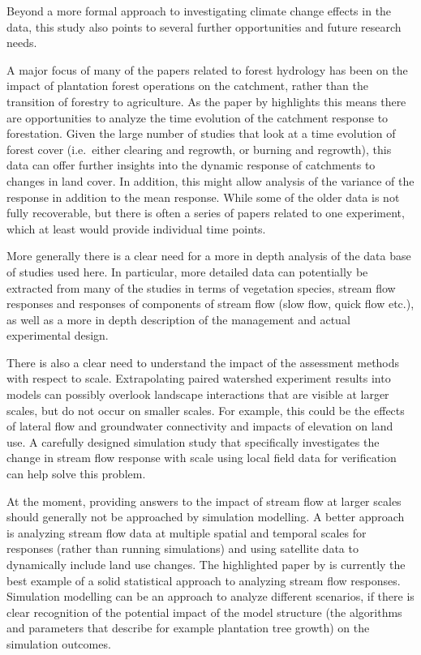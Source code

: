 \documentclass[]{elsarticle} %
\begin{document}
Beyond a more formal approach to investigating climate change effects in the data, this study also points to several further opportunities and future research needs.

A major focus of many of the papers related to forest hydrology has been on the impact of plantation forest operations on the catchment, rather than the transition of forestry to agriculture. As the paper by \citet{jones2017} highlights this means there are opportunities to analyze the time evolution of the catchment response to forestation. Given the large number of studies that look at a time evolution of forest cover (i.e.~either clearing and regrowth, or burning and regrowth), this data can offer further insights into the dynamic response of catchments to changes in land cover. In addition, this might allow analysis of the variance of the response in addition to the mean response. While some of the older data is not fully recoverable, but there is often a series of papers related to one experiment, which at least would provide individual time points.

More generally there is a clear need for a more in depth analysis of the data base of studies used here. In particular, more detailed data can potentially be extracted from many of the studies in terms of vegetation species, stream flow responses and responses of components of stream flow (slow flow, quick flow etc.), as well as a more in depth description of the management and actual experimental design.

There is also a clear need to understand the impact of the assessment methods with respect to scale. Extrapolating paired watershed experiment results into models can possibly overlook landscape interactions that are visible at larger scales, but do not occur on smaller scales. For example, this could be the effects of lateral flow and groundwater connectivity and impacts of elevation on land use. A carefully designed simulation study that specifically investigates the change in stream flow response with scale using local field data for verification can help solve this problem.

At the moment, providing answers to the impact of stream flow at larger scales should generally not be approached by simulation modelling. A better approach is analyzing stream flow data at multiple spatial and temporal scales for responses (rather than running simulations) and using satellite data to dynamically include land use changes. The highlighted paper by \citet{levy2018} is currently the best example of a solid statistical approach to analyzing stream flow responses. Simulation modelling can be an approach to analyze different scenarios, if there is clear recognition of the potential impact of the model structure (the algorithms and parameters that describe for example plantation tree growth) on the simulation outcomes.
\end{document}
